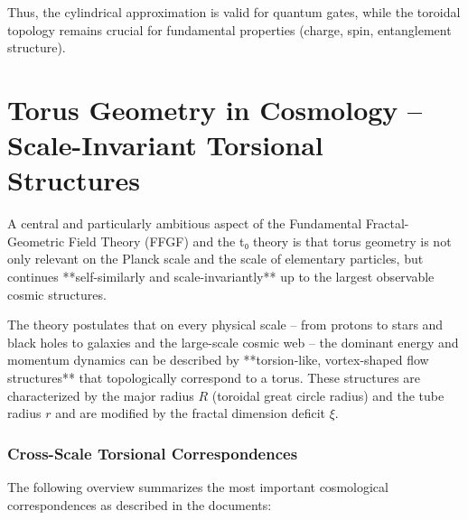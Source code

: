 \documentclass[12pt,a4paper]{article}
\begin{document}
Thus, the cylindrical approximation is valid for quantum gates, while 
the toroidal topology remains crucial for fundamental properties 
(charge, spin, entanglement structure).

\section{Torus Geometry in Cosmology – Scale-Invariant Torsional Structures}

A central and particularly ambitious aspect of the Fundamental Fractal-Geometric Field Theory (FFGF) and the t₀ theory is that torus geometry is not only relevant on the Planck scale and the scale of elementary particles, but continues **self-similarly and scale-invariantly** up to the largest observable cosmic structures.

The theory postulates that on every physical scale – from protons to stars and black holes to galaxies and the large-scale cosmic web – the dominant energy and momentum dynamics can be described by **torsion-like, vortex-shaped flow structures** that topologically correspond to a torus. These structures are characterized by the major radius $R$ (toroidal great circle radius) and the tube radius $r$ and are modified by the fractal dimension deficit $\xi$.

\subsubsection{Cross-Scale Torsional Correspondences}

The following overview summarizes the most important cosmological correspondences as described in the documents:
\end{document}
